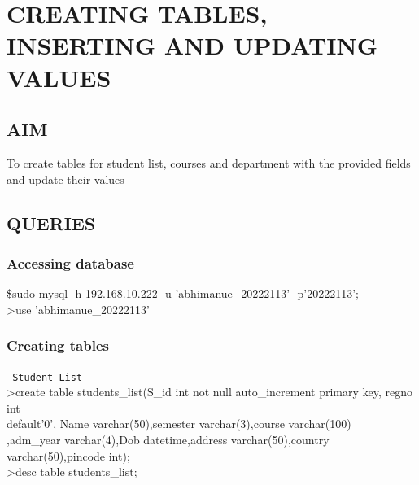 \documentclass{article}
\begin{document}
\section{CREATING TABLES, INSERTING AND UPDATING VALUES}
\hrulefill
\vspace{1cm}
\begin{flushleft}
\subsection{AIM}
To create tables for student list, courses and department with the provided fields and update their values
\subsection{QUERIES}
\subsubsection{Accessing database}
\$sudo mysql -h 192.168.10.222 -u 'abhimanue\_20222113' -p'20222113';\\
\vspace{0.1in}\hspace{0.1in}\textgreater use 'abhimanue\_20222113'
\subsubsection{Creating tables}
\texttt{-Student List}\\
\vspace{0.1in}\hspace{0.3in}\textgreater create table students\_list(S\_id int not null auto\_increment primary key, regno \vspace{0.1in}int\\ \hspace{0.3in}\vspace{0.1in} default'0', Name varchar(50),semester varchar(3),course varchar(100)\\ \hspace{0.3in}\vspace{0.1in},adm\_year varchar(4),Dob datetime,address varchar(50),country varchar(50),pincode int);\\
\vspace{0.1in}\hspace{0.5in}\textgreater desc table students\_list;
\end{flushleft}
\newpage
\end{document}
